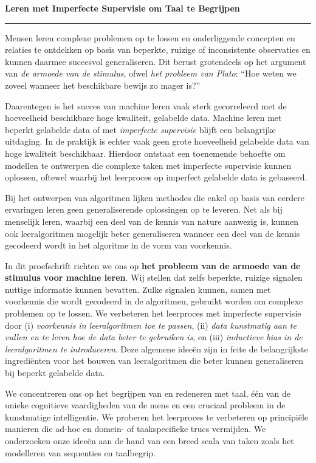 \vspace{-5pt}
\samenvatting
\vspace{-35pt}
\textbf{Leren met Imperfecte Supervisie om Taal te Begrijpen}
\vspace{-12pt}\par\noindent\rule{\textwidth}{0.4pt}
Mensen leren complexe problemen op te lossen en onderliggende concepten en relaties te ontdekken op basis van beperkte, ruizige of inconsistente observaties en kunnen daarmee succesvol generaliseren.
Dit berust grotendeels op het argument van \emph{de armoede van de stimulus}, ofwel \emph{het probleem van Plato}: ``Hoe weten we zoveel wanneer het beschikbare bewijs zo mager is?''

\vspace{-1pt}
Daarentegen is het succes van machine leren vaak sterk gecorreleerd met de hoeveelheid beschikbare hoge kwaliteit, gelabelde data. Machine leren met beperkt gelabelde data of met \emph{imperfecte supervisie} blijft een belangrijke uitdaging.
In de praktijk is echter vaak geen grote hoeveelheid gelabelde data van hoge kwaliteit beschikbaar.
Hierdoor ontstaat een toenemende behoefte om modellen te ontwerpen die complexe taken met imperfecte supervisie kunnen oplossen, oftewel waarbij het leerproces op imperfect gelabelde data is gebaseerd.

Bij het ontwerpen van algoritmen lijken methodes die enkel op basis van eerdere ervaringen leren geen generaliserende oplossingen op te leveren.
Net als bij menselijk leren, waarbij een deel van de kennis van nature aanwezig is, kunnen ook leeralgoritmen mogelijk beter generaliseren wanneer een deel van de kennis gecodeerd wordt in het algoritme in de vorm van voorkennis.

\vspace{-1pt}
In dit proefschrift richten we ons op \textbf{het probleem van de armoede van de stimulus voor machine leren}.
Wij stellen dat zelfs beperkte, ruizige signalen nuttige informatie kunnen bevatten.
Zulke signalen kunnen, samen met voorkennis die wordt gecodeerd in de algoritmen, gebruikt worden om complexe problemen op te lossen.
We verbeteren het leerproces met imperfecte supervisie door (i) \emph{voorkennis in leeralgoritmen toe te passen}, (ii) \emph{data kunstmatig aan te vullen en te leren hoe de data beter te gebruiken is}, en (iii) \emph{inductieve bias in de leeralgoritmen te introduceren}.
Deze algemene ideeën zijn in feite de belangrijkste ingrediënten voor het bouwen van leeralgoritmen die beter kunnen generaliseren bij beperkt gelabelde data.

\vspace{-1pt}
We concentreren ons op het begrijpen van en redeneren met taal, \'e\'en van de unieke cognitieve vaardigheden van de mens en een cruciaal probleem in de kunstmatige intelligentie.
We proberen het leerproces te verbeteren op principiële manieren die ad-hoc en domein- of taakspecifieke trucs vermijden.
We onderzoeken onze ideeën aan de hand van een breed scala van taken zoals het modelleren van sequenties en taalbegrip.